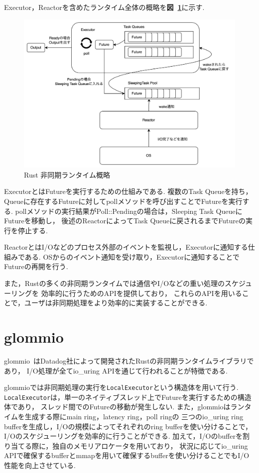 \documentclass[a4paper,11pt,openany]{jreport}
\newcommand\figref[1]{\textbf{図~\ref{fig:#1}}}
\begin{document}
Executor，Reactorを含めたランタイム全体の概略を\figref{runtime}に示す.
\begin{figure}[tb]
	\centering
	\includegraphics[width=15cm, bb=0 0 3555 2505]{figures/rust_async.drawio.png}
	\caption{Rust 非同期ランタイム概略}
	\label{fig:runtime}
\end{figure}
ExecutorとはFutureを実行するための仕組みである.
複数のTask Queueを持ち，Queueに存在するFutureに対してpollメソッドを呼び出すことでFutureを実行する.
pollメソッドの実行結果がPoll::Pendingの場合は，Sleeping Task QueueにFutureを移動し，
後述のReactorによってTask Queueに戻されるまでFutureの実行を停止する.

ReactorとはI/Oなどのプロセス外部のイベントを監視し，Executorに通知する仕組みである.
OSからのイベント通知を受け取り，Executorに通知することでFutureの再開を行う.

また，Rustの多くの非同期ランタイムでは通信やI/Oなどの重い処理のスケジューリングを
効率的に行うためのAPIを提供しており，
これらのAPIを用いることで，ユーザは非同期処理をより効率的に実装することができる.

\section{glommio}
glommio~\cite{glommio}はDatadog社によって開発されたRustの非同期ランタイムライブラリであり，
I/O処理が全てio\_uring APIを通じて行われることが特徴である.

glommioでは非同期処理の実行を\lstinline|LocalExecutor|という構造体を用いて行う.
\lstinline|LocalExecutor|は，単一のネイティブスレッド上でFutureを実行するための構造体であり，
スレッド間でのFutureの移動が発生しない.
また，glommioはランタイムを生成する際にmain ring，latency ring，poll ringの
三つのio\_uring ring bufferを生成し，I/Oの規模によってそれぞれのring bufferを使い分けることで，
I/Oのスケジューリングを効率的に行うことができる.
加えて，I/Oのbufferを割り当てる際に，独自のメモリアロケータを用いており，
状況に応じてio\_uring APIで確保するbufferとmmapを用いて確保するbufferを使い分けることでもI/O性能を向上させている.
\end{document}
